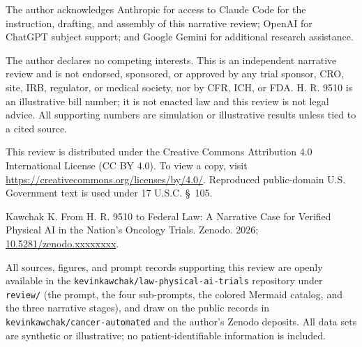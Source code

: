 
The author acknowledges Anthropic for access to Claude Code for the instruction,
drafting, and assembly of this narrative review; OpenAI for ChatGPT subject
support; and Google Gemini for additional research assistance.

The author declares no competing interests. This is an independent narrative
review and is not endorsed, sponsored, or approved by any trial sponsor, CRO,
site, IRB, regulator, or medical society, nor by CFR, ICH, or FDA. H. R. 9510 is
an illustrative bill number; it is not enacted law and this review is not legal
advice. All supporting numbers are simulation or illustrative results unless tied
to a cited source.

This review is distributed under the Creative Commons Attribution 4.0
International License (CC BY 4.0). To view a copy, visit
\url{https://creativecommons.org/licenses/by/4.0/}. Reproduced public-domain U.S.
Government text is used under 17 U.S.C. \S~105.

Kawchak K. From H. R. 9510 to Federal Law: A Narrative Case for Verified Physical
AI in the Nation's Oncology Trials. Zenodo. 2026;
\href{https://doi.org/10.5281/zenodo.xxxxxxxx}{10.5281/zenodo.xxxxxxxx}.

All sources, figures, and prompt records supporting this review are openly
available in the \texttt{kevinkawchak/law-physical-ai-trials} repository under
\texttt{review/} (the prompt, the four sub-prompts, the colored Mermaid catalog,
and the three narrative stages), and draw on the public records in
\texttt{kevinkawchak/cancer-automated} and the author's Zenodo deposits. All data
sets are synthetic or illustrative; no patient-identifiable information is
included.
